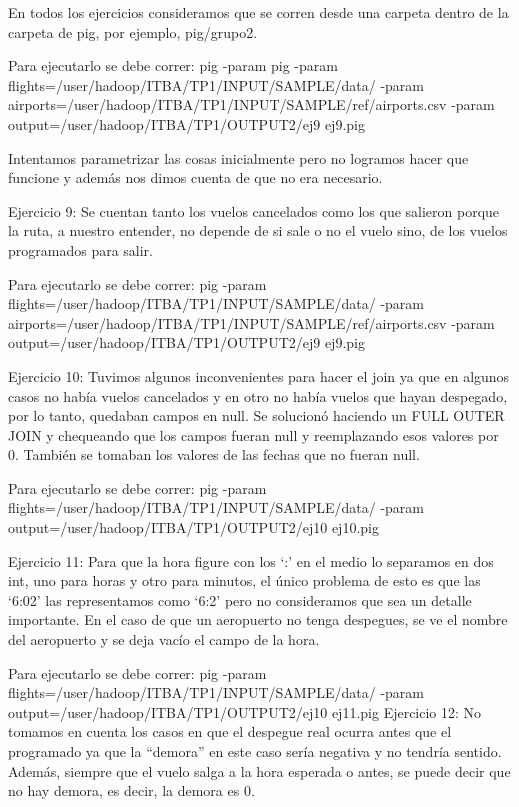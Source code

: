 \documentclass[a4paper,10pt]{article}
\begin{document}
En todos los ejercicios consideramos que se corren desde una carpeta dentro de la carpeta de pig, por ejemplo, pig/grupo2.

Para ejecutarlo se debe correr: 
pig -param pig -param flights=/user/hadoop/ITBA/TP1/INPUT/SAMPLE/data/ -param airports=/user/hadoop/ITBA/TP1/INPUT/SAMPLE/ref/airports.csv -param output=/user/hadoop/ITBA/TP1/OUTPUT2/ej9 ej9.pig

Intentamos parametrizar las cosas inicialmente pero no logramos hacer que funcione y además nos dimos cuenta de que no era necesario.

Ejercicio 9: Se cuentan tanto los vuelos cancelados como los que salieron porque la ruta, a nuestro entender, no depende de si sale o no el vuelo sino, de los vuelos programados para salir. 

Para ejecutarlo se debe correr: 
pig -param flights=/user/hadoop/ITBA/TP1/INPUT/SAMPLE/data/ -param airports=/user/hadoop/ITBA/TP1/INPUT/SAMPLE/ref/airports.csv -param output=/user/hadoop/ITBA/TP1/OUTPUT2/ej9 ej9.pig

Ejercicio 10: Tuvimos algunos inconvenientes para hacer el join ya que en algunos casos no había vuelos cancelados y en otro no había vuelos que hayan despegado, por lo tanto, quedaban campos en null. Se solucionó haciendo un FULL OUTER JOIN y chequeando que los campos fueran null y reemplazando esos valores por 0. También se tomaban los valores de las fechas que no fueran null.

Para ejecutarlo se debe correr: 
pig -param flights=/user/hadoop/ITBA/TP1/INPUT/SAMPLE/data/ -param output=/user/hadoop/ITBA/TP1/OUTPUT2/ej10 ej10.pig

Ejercicio 11: Para que la hora figure con los ‘:’ en el medio lo separamos en dos int, uno para horas y otro para minutos, el único problema de esto es que las ‘6:02’ las representamos como ‘6:2’ pero no consideramos que sea un detalle importante.
En el caso de que un aeropuerto no tenga despegues, se ve el nombre del aeropuerto y se deja vacío el campo de la hora.

Para ejecutarlo se debe correr: 
pig -param flights=/user/hadoop/ITBA/TP1/INPUT/SAMPLE/data/ -param output=/user/hadoop/ITBA/TP1/OUTPUT2/ej10 ej11.pig
Ejercicio 12:
No tomamos en cuenta los casos en que el despegue real ocurra antes que el programado ya que la “demora” en este caso sería negativa y no tendría sentido. Además, siempre que el vuelo salga a la hora esperada o antes, se puede decir que no hay demora, es decir, la demora es 0.
\end{document}

